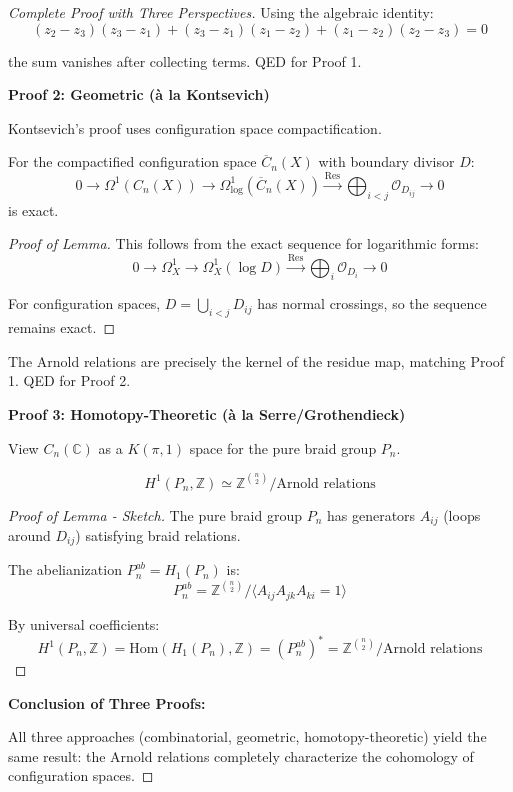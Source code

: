 \begin{proof}[Complete Proof with Three Perspectives]
Using the algebraic identity:
$$(z_2-z_3)(z_3-z_1) + (z_3-z_1)(z_1-z_2) + (z_1-z_2)(z_2-z_3) = 0$$

the sum vanishes after collecting terms. QED for Proof 1.

\textbf{Proof 2: Geometric (à la Kontsevich)}

Kontsevich's proof uses configuration space compactification.

\begin{lemma}\label{lem:residue-exact-arnold}
For the compactified configuration space $\overline{C}_n(X)$ with boundary divisor $D$:
$$0 \to \Omega^1(C_n(X)) \to \Omega^1_{\log}(\overline{C}_n(X)) \xrightarrow{\text{Res}} 
\bigoplus_{i<j} \mathcal{O}_{D_{ij}} \to 0$$
is exact.
\end{lemma}

\begin{proof}[Proof of Lemma]
This follows from the exact sequence for logarithmic forms:
$$0 \to \Omega^1_X \to \Omega^1_X(\log D) \xrightarrow{\text{Res}} \bigoplus_i \mathcal{O}_{D_i} 
\to 0$$

For configuration spaces, $D = \bigcup_{i<j} D_{ij}$ has normal crossings, so the 
sequence remains exact.
\end{proof}

The Arnold relations are precisely the kernel of the residue map, matching Proof 1. QED for Proof 2.

\textbf{Proof 3: Homotopy-Theoretic (à la Serre/Grothendieck)}

View $C_n(\mathbb{C})$ as a $K(\pi, 1)$ space for the pure braid group $P_n$.

\begin{lemma}\label{lem:braid-cohomology-arnold}
$$H^1(P_n, \mathbb{Z}) \simeq \mathbb{Z}^{\binom{n}{2}} / \text{Arnold relations}$$
\end{lemma}

\begin{proof}[Proof of Lemma - Sketch]
The pure braid group $P_n$ has generators $A_{ij}$ (loops around $D_{ij}$) satisfying 
braid relations.

The abelianization $P_n^{ab} = H_1(P_n)$ is:
$$P_n^{ab} = \mathbb{Z}^{\binom{n}{2}} / \langle A_{ij}A_{jk}A_{ki} = 1 \rangle$$

By universal coefficients:
$$H^1(P_n, \mathbb{Z}) = \text{Hom}(H_1(P_n), \mathbb{Z}) = (P_n^{ab})^* 
= \mathbb{Z}^{\binom{n}{2}} / \text{Arnold relations}$$
\end{proof}

\textbf{Conclusion of Three Proofs:}

All three approaches (combinatorial, geometric, homotopy-theoretic) yield the same 
result: the Arnold relations completely characterize the cohomology of configuration 
spaces.

\end{proof}

